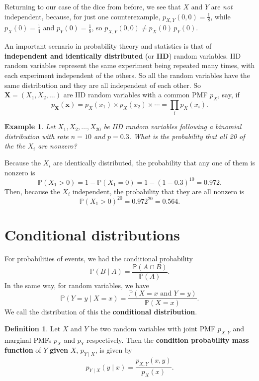 \documentclass[
  a4paper,
]{book}
\theoremstyle{definition}
\newtheorem{definition}{Definition}[chapter]
\theoremstyle{definition}
\newtheorem{example}{Example}[chapter]
\theoremstyle{definition}
\theoremstyle{definition}
\theoremstyle{remark}
\begin{document}
Returning to our case of the dice from before, we see that \(X\) and \(Y\) are \emph{not} independent, because, for just one counterexample, \(p_{X,Y}(0,0) = \frac18\), while \(p_X(0) = \frac14\) and \(p_Y(0) = \frac18\), so \(p_{X,Y}(0,0) \neq p_X(0) \, p_Y(0)\).

An important scenario in probability theory and statistics is that of \textbf{independent and identically distributed} (or \textbf{IID}) random variables. IID random variables represent the same experiment being repeated many times, with each experiment independent of the others. So all the random variables have the same distribution and they are all independent of each other. So \(\mathbf X = (X_1, X_2, \dots )\) are IID random variables with a common PMF \(p_X\), say, if
\[ p_{\mathbf X}(\mathbf x) = p_X(x_1) \times p_X(x_2) \times \cdots = \prod_i p_X(x_i) . \]

\begin{example}
\emph{Let \(X_1, X_2, \dots, X_{20}\) be IID random variables following a binomial distribution with rate \(n = 10\) and \(p = 0.3\). What is the probability that all 20 of the the \(X_i\) are nonzero?}

Because the \(X_i\) are identically distributed, the probability that any one of them is nonzero is
\[ \mathbb P(X_1 > 0) = 1 - \mathbb P(X_1 = 0) = 1 - (1 - 0.3)^{10} = 0.972 . \]
Then, because the \(X_i\) independent, the probability that they are all nonzero is
\[ \mathbb P(X_1 > 0)^{20} = 0.972^{20} = 0.564. \]
\end{example}

\hypertarget{cond-rv}{%
\section{Conditional distributions}\label{cond-rv}}

For probabilities of events, we had the conditional probability
\[ \mathbb P(B \mid A) = \frac{\mathbb P(A \cap B)}{\mathbb P(A)} . \]
In the same way, for random variables, we have
\[ \mathbb P(Y = y \mid X = x) = \frac{\mathbb P(X = x \text{ and } Y = y)}{\mathbb P(X = x)} . \]
We call the distribution of this the \textbf{conditional distribution}.

\begin{definition}
Let \(X\) and \(Y\) be two random variables with joint PMF \(p_{X,Y}\) and marginal PMFs \(p_X\) and \(p_Y\) respectively. Then the \textbf{condition probability mass function} of \(Y\) \textbf{given} \(X\), \(p_{Y \mid X}\), is given by
\[ p_{Y \mid X}(y \mid x) = \frac{p_{X,Y}(x,y)}{p_X(x)} .   \]
\end{definition}
\end{document}
